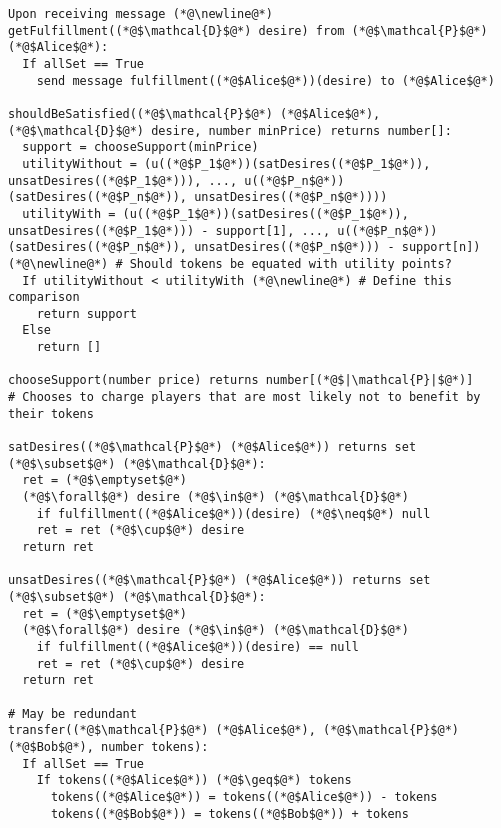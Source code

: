 \begin{lstlisting}[label=satfunc, style=numbers]
Upon receiving message (*@\newline@*) getFulfillment((*@$\mathcal{D}$@*) desire) from (*@$\mathcal{P}$@*) (*@$Alice$@*):
  If allSet == True
    send message fulfillment((*@$Alice$@*))(desire) to (*@$Alice$@*)

shouldBeSatisfied((*@$\mathcal{P}$@*) (*@$Alice$@*), (*@$\mathcal{D}$@*) desire, number minPrice) returns number[]:
  support = chooseSupport(minPrice)
  utilityWithout = (u((*@$P_1$@*))(satDesires((*@$P_1$@*)), unsatDesires((*@$P_1$@*))), ..., u((*@$P_n$@*))(satDesires((*@$P_n$@*)), unsatDesires((*@$P_n$@*))))
  utilityWith = (u((*@$P_1$@*))(satDesires((*@$P_1$@*)), unsatDesires((*@$P_1$@*))) - support[1], ..., u((*@$P_n$@*))(satDesires((*@$P_n$@*)), unsatDesires((*@$P_n$@*))) - support[n]) (*@\newline@*) # Should tokens be equated with utility points?
  If utilityWithout < utilityWith (*@\newline@*) # Define this comparison
    return support
  Else
    return []

chooseSupport(number price) returns number[(*@$|\mathcal{P}|$@*)]
# Chooses to charge players that are most likely not to benefit by their tokens

satDesires((*@$\mathcal{P}$@*) (*@$Alice$@*)) returns set (*@$\subset$@*) (*@$\mathcal{D}$@*):
  ret = (*@$\emptyset$@*)
  (*@$\forall$@*) desire (*@$\in$@*) (*@$\mathcal{D}$@*)
    if fulfillment((*@$Alice$@*))(desire) (*@$\neq$@*) null
    ret = ret (*@$\cup$@*) desire
  return ret

unsatDesires((*@$\mathcal{P}$@*) (*@$Alice$@*)) returns set (*@$\subset$@*) (*@$\mathcal{D}$@*):
  ret = (*@$\emptyset$@*)
  (*@$\forall$@*) desire (*@$\in$@*) (*@$\mathcal{D}$@*)
    if fulfillment((*@$Alice$@*))(desire) == null
    ret = ret (*@$\cup$@*) desire
  return ret

# May be redundant
transfer((*@$\mathcal{P}$@*) (*@$Alice$@*), (*@$\mathcal{P}$@*) (*@$Bob$@*), number tokens):
  If allSet == True
    If tokens((*@$Alice$@*)) (*@$\geq$@*) tokens
      tokens((*@$Alice$@*)) = tokens((*@$Alice$@*)) - tokens
      tokens((*@$Bob$@*)) = tokens((*@$Bob$@*)) + tokens
\end{lstlisting}
